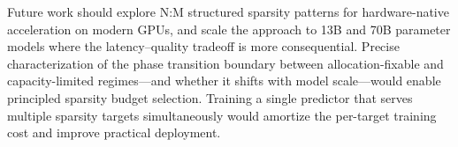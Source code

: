 Future work should explore N:M structured sparsity patterns for hardware-native acceleration on modern GPUs, and scale the approach to 13B and 70B parameter models where the latency--quality tradeoff is more consequential.
Precise characterization of the phase transition boundary between allocation-fixable and capacity-limited regimes---and whether it shifts with model scale---would enable principled sparsity budget selection.
Training a single predictor that serves multiple sparsity targets simultaneously would amortize the per-target training cost and improve practical deployment.